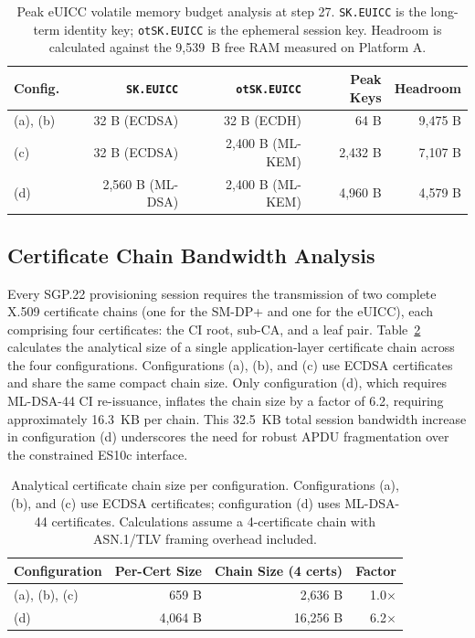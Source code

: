 \documentclass[a4paper,fleqn]{cas-sc}
\begin{document}
\begin{table}[!htb]
\caption{Peak eUICC volatile memory budget analysis at step 27. \texttt{SK.EUICC} is the long-term identity key; \texttt{otSK.EUICC} is the ephemeral session key. Headroom is calculated against the 9,539~B free RAM measured on Platform A.}
\label{tab:ram-budget}
\centering
\footnotesize
\setlength{\tabcolsep}{4pt}
\renewcommand{\arraystretch}{1.1}
\begin{tabular}{@{}lrrrr@{}}
\toprule
\textbf{Config.} & \textbf{\texttt{SK.EUICC}} & \textbf{\texttt{otSK.EUICC}} & \textbf{Peak Keys} & \textbf{Headroom} \\
\midrule
(a), (b) & 32 B (ECDSA) & 32 B (ECDH) & 64 B & 9{,}475 B \\
(c) & 32 B (ECDSA) & 2{,}400 B (ML-KEM) & 2{,}432 B & 7{,}107 B \\
(d) & 2{,}560 B (ML-DSA) & 2{,}400 B (ML-KEM) & 4{,}960 B & 4{,}579 B \\
\bottomrule
\end{tabular}
\end{table}

\subsection{Certificate Chain Bandwidth Analysis}
\label{sec:bench-bandwidth}

Every SGP.22 provisioning session requires the transmission of two complete X.509 certificate chains (one for the SM-DP+ and one for the eUICC), each comprising four certificates: the CI root, sub-CA, and a leaf pair. Table~\ref{tab:cert-chain} calculates the analytical size of a single application-layer certificate chain across the four configurations. Configurations (a), (b), and (c) use ECDSA certificates and share the same compact chain size. Only configuration (d), which requires ML-DSA-44 CI re-issuance, inflates the chain size by a factor of 6.2, requiring approximately 16.3~KB per chain. This 32.5~KB total session bandwidth increase in configuration (d) underscores the need for robust APDU fragmentation over the constrained ES10c interface.

\begin{table}[!htb]
\caption{Analytical certificate chain size per configuration. Configurations (a), (b), and (c) use ECDSA certificates; configuration (d) uses ML-DSA-44 certificates. Calculations assume a 4-certificate chain with ASN.1/TLV framing overhead included.}
\label{tab:cert-chain}
\centering
\footnotesize
\setlength{\tabcolsep}{4pt}
\renewcommand{\arraystretch}{1.1}
\begin{tabular}{@{}lrrr@{}}
\toprule
\textbf{Configuration} & \textbf{Per-Cert Size} & \textbf{Chain Size (4 certs)} & \textbf{Factor} \\
\midrule
(a), (b), (c) & 659 B & 2{,}636 B & 1.0$\times$ \\
(d)           & 4{,}064 B & 16{,}256 B & 6.2$\times$ \\
\bottomrule
\end{tabular}
\end{table}
\end{document}

